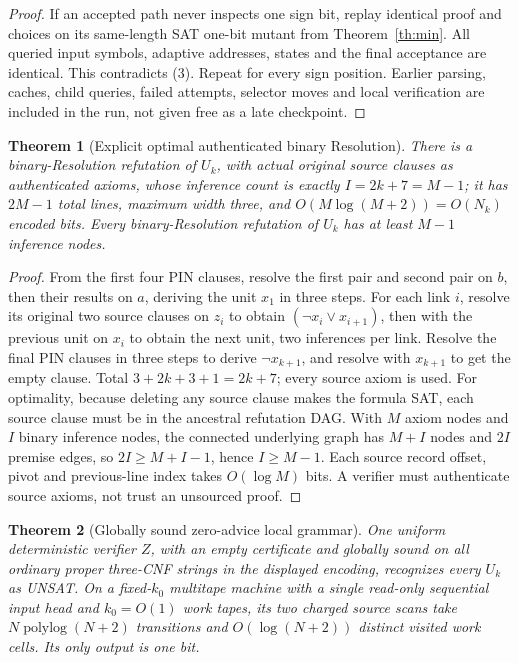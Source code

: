\documentclass[11pt]{article}
\newtheorem{theorem}{Theorem}
\begin{document}
\begin{proof}
If an accepted path never inspects one sign bit, replay identical proof and choices on its same-length SAT one-bit mutant from Theorem~\ref{th:min}. All queried input symbols, adaptive addresses, states and the final acceptance are identical. This contradicts (3). Repeat for every sign position. Earlier parsing, caches, child queries, failed attempts, selector moves and local verification are included in the run, not given free as a late checkpoint.
\end{proof}
\begin{theorem}[Explicit optimal authenticated binary Resolution]\label{th:res}
There is a binary-Resolution refutation of \(U_k\), with actual original source clauses as authenticated axioms, whose inference count is exactly \(I=2k+7=M-1\); it has \(2M-1\) total lines, maximum width three, and \(O(M\log(M+2))=O(N_k)\) encoded bits. Every binary-Resolution refutation of \(U_k\) has at least \(M-1\) inference nodes.
\end{theorem}
\begin{proof}
From the first four PIN clauses, resolve the first pair and second pair on \(b\), then their results on \(a\), deriving the unit \(x_1\) in three steps. For each link \(i\), resolve its original two source clauses on \(z_i\) to obtain \((\neg x_i\vee x_{i+1})\), then with the previous unit on \(x_i\) to obtain the next unit, two inferences per link. Resolve the final PIN clauses in three steps to derive \(\neg x_{k+1}\), and resolve with \(x_{k+1}\) to get the empty clause. Total \(3+2k+3+1=2k+7\); every source axiom is used. For optimality, because deleting any source clause makes the formula SAT, each source clause must be in the ancestral refutation DAG. With \(M\) axiom nodes and \(I\) binary inference nodes, the connected underlying graph has \(M+I\) nodes and \(2I\) premise edges, so \(2I\ge M+I-1\), hence \(I\ge M-1\). Each source record offset, pivot and previous-line index takes \(O(\log M)\) bits. A verifier must authenticate source axioms, not trust an unsourced proof.
\end{proof}
\begin{theorem}[Globally sound zero-advice local grammar]\label{th:zero}
One uniform deterministic verifier \(Z\), with an empty certificate and globally sound on \emph{all} ordinary proper three-CNF strings in the displayed encoding, recognizes every \(U_k\) as UNSAT. On a fixed-\(k_0\) multitape machine with a single read-only sequential input head and \(k_0=O(1)\) work tapes, its two charged source scans take \(N\operatorname{polylog}(N+2)\) transitions and \(O(\log(N+2))\) distinct visited work cells. Its only output is one bit.
\end{theorem}
\end{document}
